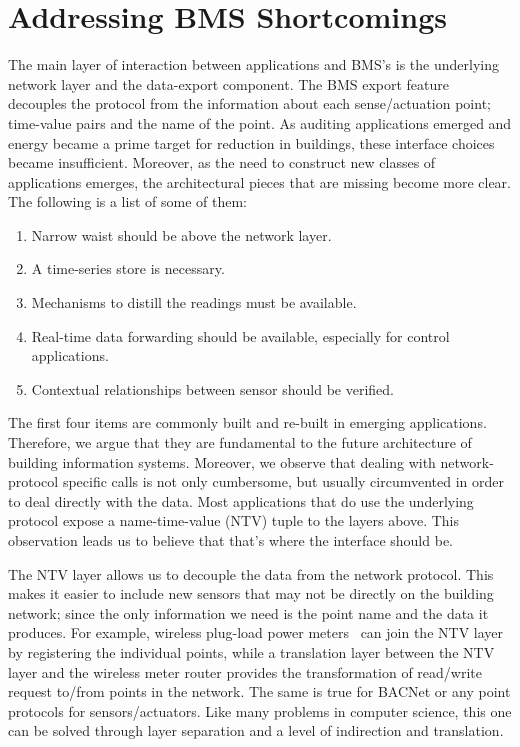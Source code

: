 
\section{Addressing BMS Shortcomings}
\label{sec:shortcomings}
The main layer of interaction between applications and BMS's is the underlying network layer and the data-export component.  
The BMS export feature decouples the protocol from the information about each sense/actuation point; time-value
pairs and the name of the point. As auditing applications emerged and energy became a prime target for reduction in buildings, 
these interface choices became insufficient.  Moreover, as the need to construct new classes of applications emerges, the architectural
pieces that are missing become more clear.  The following is a list of some of them:

\begin{enumerate}
\item Narrow waist should be above the network layer. \label{nw}
\item A time-series store is necessary. \label{ts}
\item Mechanisms to distill the readings must be available. \label{proc}
\item Real-time data forwarding should be available, especially for control applications. \label{rt}
\item Contextual relationships between sensor should be verified. \label{cntxt}
\end{enumerate}

The first four items are commonly built and re-built in emerging applications.  Therefore, we argue that they are fundamental 
to the future architecture of building information systems.  Moreover, we observe that dealing with network-protocol specific
calls is not only cumbersome, but usually circumvented in order to deal directly with the data.  Most applications that do
use the underlying protocol expose a name-time-value (NTV) tuple to the layers above.  This observation leads us to believe that
that's where the interface should be.

The NTV layer allows us to decouple the data from the network protocol.  This makes it easier to include 
new sensors that may not be directly on the building network; since the only information we need is the point name and the data it
produces.  For example, wireless plug-load power meters~\cite{acme}
can join the NTV layer by registering the individual points, while a translation layer between the NTV layer and the
wireless meter router provides the transformation of read/write request to/from points in the network.  The same is true for BACNet
or any point protocols for sensors/actuators.  Like many problems in computer science, this one can be solved through layer separation
and a level of indirection and translation.

